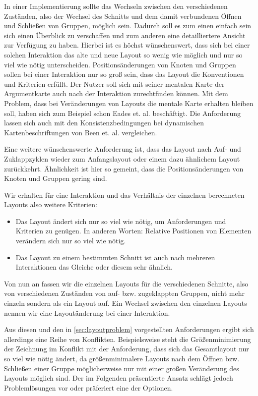 In einer Implementierung sollte das Wechseln zwischen den verschiedenen Zuständen, also der Wechsel des Schnitts und dem damit verbundenen Öffnen und Schließen von Gruppen, möglich sein. 
Dadurch soll es zum einen einfach sein sich einen Überblick zu verschaffen und zum anderen eine detailliertere Ansicht zur Verfügung zu haben.
Hierbei ist es höchst wünschenswert, dass sich bei einer solchen Interaktion das alte und neue Layout so wenig wie möglich und nur so viel wie nötig unterscheiden. 
Positionsänderungen von Knoten und Gruppen sollen bei einer Interaktion nur so groß sein, dass das Layout die Konventionen und Kriterien erfüllt.
Der Nutzer soll sich mit seiner mentalen Karte der Argumentkarte auch nach der Interaktion zurechtfinden können. 
Mit dem Problem, dass bei Veränderungen von Layouts die mentale Karte erhalten bleiben soll, haben sich zum Beispiel schon Eades et. al. \cite{eades1991preserving, Misue1995183}
beschäftigt. Die Anforderung lassen sich auch mit den Konsistenzbedingungen bei dynamischen Kartenbeschriftungen von  Been et. al. \cite{Been2010312} vergleichen.

Eine weitere wünschenswerte Anforderung ist, dass das Layout nach  Auf- und Zuklappzyklen 
wieder zum Anfangslayout oder einem dazu ähnlichem Layout zurückkehrt. 
Ähnlichkeit ist hier so gemeint, dass die Positionsänderungen von Knoten und Gruppen gering sind.

Wir erhalten für eine Interaktion und das Verhältnis der einzelnen berechneten Layouts also weitere Kriterien:
\begin{itemize}
\item Das Layout ändert sich nur so viel wie nötig, um Anforderungen und Kriterien zu genügen. 
In anderen Worten: Relative Positionen von Elementen verändern sich nur so viel wie nötig.
\item Das Layout zu einem bestimmten Schnitt ist auch nach mehreren Interaktionen das Gleiche oder diesem sehr ähnlich.
\end{itemize}

Von nun an fassen wir die einzelnen Layouts für die verschiedenen Schnitte, also von verschiedenen Zuständen von auf- bzw. zugeklappten Gruppen, nicht mehr einzeln
sondern als ein Layout auf. Ein Wechsel zwischen den einzelnen Layouts nennen wir eine Layoutänderung bei einer Interaktion.

Aus diesen und den in \autoref{sec:layoutproblem} vorgestellten Anforderungen ergibt sich allerdings eine Reihe von Konflikten.
Beispielsweise steht die Größenminimierung der Zeichnung im Konflikt mit der Anforderung, dass sich das Gesamtlayout nur so viel wie nötig ändert, 
da größenminimalere Layouts nach dem Öffnen bzw. Schließen einer Gruppe möglicherweise nur mit einer großen Veränderung des Layouts möglich sind.
Der im Folgenden präsentierte Ansatz schlägt jedoch Problemlösungen vor oder präferiert eine der Optionen.

